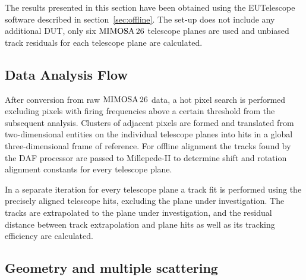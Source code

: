 The results presented in this section have been obtained using the EUTelescope software described in section~\ref{sec:offline}.
The set-up does not include any additional DUT, only six $\textrm{MIMOSA\,26}$ telescope planes are used and unbiased track residuals for each telescope plane are calculated.

\subsection{Data Analysis Flow}
\label{sec:datura-nodut}

After conversion from raw $\textrm{MIMOSA\,26}$ data, a hot pixel search is performed excluding pixels with firing frequencies above a certain threshold from the subsequent analysis.
Clusters of adjacent pixels are formed and translated from two-dimensional entities on the individual telescope planes into hits in a global three-dimensional frame of reference.
For offline alignment the tracks found by the DAF processor are passed to Millepede-II to determine shift and rotation alignment constants for every telescope plane.

In a separate iteration for every telescope plane a track fit is performed using the precisely aligned telescope hits, excluding the plane under investigation.
The tracks are extrapolated to the plane under investigation, and the residual distance between track extrapolation and plane hits as well as its tracking efficiency are calculated.

\subsection{Geometry and multiple scattering}
\label{sec:multiplescattering}

